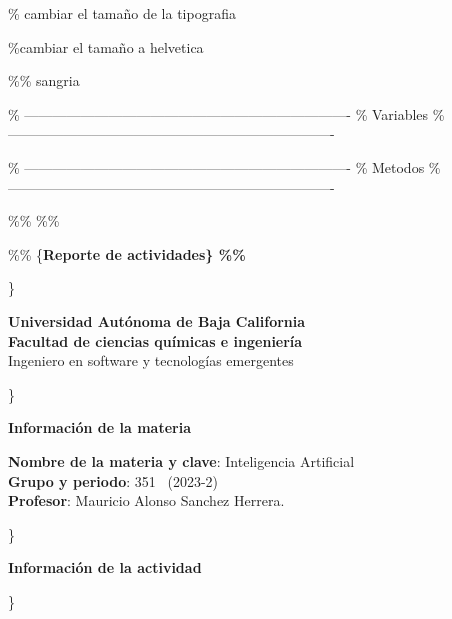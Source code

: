 \documentclass[11pt]{article}
\begin{document}
\% cambiar el tamaño de la tipografia
\setlength{\headheight}{12.5pt}

\%cambiar el tamaño a helvetica
\renewcommand\familydefault{\sfdefault} 

\%\% sangria
\setlength{\parindent}{0pt}


\% ----------------------------------------------------------------------
\%                            Variables
\% ----------------------------------------------------------------------

\newcommand{\university}{Universidad Autónoma de Baja California}
\newcommand{\facultad}{Facultad de ciencias químicas e ingeniería}
\newcommand{\program}{Ingeniero en software y tecnologías emergentes}
\newcommand{\subject}{Inteligencia Artificial}
\newcommand{\group}{351}
\newcommand{\period}{2023-2}
\newcommand{\docente}{Mauricio Alonso Sanchez Herrera}

\% ----------------------------------------------------------------------
\%                             Metodos 
\% ----------------------------------------------------------------------



\newcommand{\datasection}[1]\{
  \universitytitle
  \pugacurso
  \%\% \vspace{12.5pt}
  \%\% \begin{center}
  \%\%   \{\large\bfseries Reporte de actividades\}
  \%\% \end{center}
\}


\newcommand{\universitytitle}\{
\begin{center}
    \Large
    \textbf{\university \\ 
    \facultad} \\
    \vspace{0.25in}
    \large
    \program
    \vspace*{.25in}
\end{center}
\}

\newcommand{\pugacurso}\{
\begin{center}
  {\large\bfseries Información de la materia}
  \begin{mdframed}
    \textbf{Nombre de la materia y clave}: \subject \\
    \textbf{Grupo y periodo}: \group ~ (\period) \\
    \textbf{Profesor}: \docente.
  \end{mdframed}
\end{center}
\}

\newcommand{\pugaactividad}[1]\{
\begin{center}
  {\large\bfseries Información de la actividad}
\end{center}
\}
\end{document}
